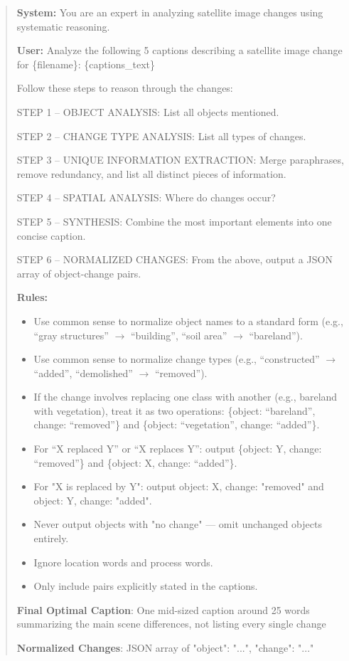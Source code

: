\begin{quote}
\small
\textbf{System:} You are an expert in analyzing satellite
image changes using systematic reasoning.
 
\textbf{User:} Analyze the following 5 captions describing
a satellite image change for \{filename\}:
\{captions\_text\}
 
Follow these steps to reason through the changes:
 
STEP 1 -- OBJECT ANALYSIS: List all objects mentioned.
 
STEP 2 -- CHANGE TYPE ANALYSIS: List all types of changes.
 
STEP 3 -- UNIQUE INFORMATION EXTRACTION: Merge paraphrases,
remove redundancy, and list all distinct pieces of
information.
 
STEP 4 -- SPATIAL ANALYSIS: Where do changes occur?
 
STEP 5 -- SYNTHESIS: Combine the most important elements
into one concise caption.
 
STEP 6 -- NORMALIZED CHANGES: From the above, output a
JSON array of object-change pairs.
 
\textbf{Rules:}
\begin{itemize}
    \item Use common sense to normalize object names to a
    standard form (e.g., ``gray structures'' $\to$
    ``building'', ``soil area'' $\to$ ``bareland'').
    \item Use common sense to normalize change types (e.g.,
    ``constructed'' $\to$ ``added'', ``demolished'' $\to$
    ``removed'').
    \item If the change involves replacing one class with
    another (e.g., bareland with vegetation), treat it as
    two operations: \{object: ``bareland'', change:
    ``removed''\} and \{object: ``vegetation'', change:
    ``added''\}.
    \item For ``X replaced Y'' or ``X replaces Y'': output
    \{object: Y, change: ``removed''\} and \{object: X,
    change: ``added''\}.
    \item For "X is replaced by Y": output {object: X, change: "removed"} 
  and {object: Y, change: "added"}.
\item Never output objects with "no change" — omit unchanged objects 
entirely.
\item Ignore location words and process words.
\item Only include pairs explicitly stated in the captions.
\end{itemize}
\textbf{Final Optimal Caption}:
One mid-sized caption around 25 words summarizing the main scene 
differences, not listing every single change

\textbf{Normalized Changes}:
JSON array of {"object": "...", "change": "..."}
\end{quote}
 
